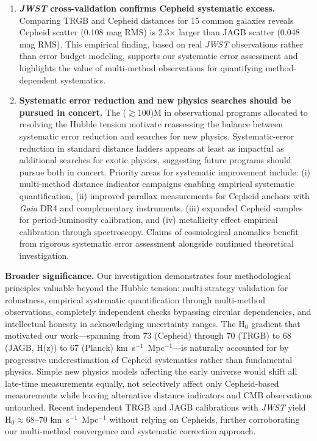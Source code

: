 \documentclass[preprint, linenumbers]{aastex701}
\begin{document}
\begin{enumerate}
\item \textbf{\textit{JWST} cross-validation confirms Cepheid systematic excess.} Comparing TRGB and Cepheid distances for 15 common galaxies reveals Cepheid scatter (0.108 mag RMS) is 2.3$\times$ larger than JAGB scatter (0.048 mag RMS). This empirical finding, based on real \textit{JWST} observations rather than error budget modeling, supports our systematic error assessment and highlights the value of multi-method observations for quantifying method-dependent systematics.

\item \textbf{Systematic error reduction and new physics searches should be pursued in concert.} The ($\gtrsim$100)M in observational programs allocated to resolving the Hubble tension motivate reassessing the balance between systematic error reduction and searches for new physics. Systematic-error reduction in standard distance ladders appears at least as impactful as additional searches for exotic physics, suggesting future programs should pursue both in concert. Priority areas for systematic improvement include: (i) multi-method distance indicator campaigns enabling empirical systematic quantification, (ii) improved parallax measurements for Cepheid anchors with \textit{Gaia} DR4 and complementary instruments, (iii) expanded Cepheid samples for period-luminosity calibration, and (iv) metallicity effect empirical calibration through spectroscopy. Claims of cosmological anomalies benefit from rigorous systematic error assessment alongside continued theoretical investigation.

\end{enumerate}

\textbf{Broader significance.} Our investigation demonstrates four methodological principles valuable beyond the Hubble tension: multi-strategy validation for robustness, empirical systematic quantification through multi-method observations, completely independent checks bypassing circular dependencies, and intellectual honesty in acknowledging uncertainty ranges. The H$_0$ gradient that motivated our work---spanning from 73 (Cepheid) through 70 (TRGB) to 68 (JAGB, H(z)) to 67 (Planck) km~s$^{-1}$~Mpc$^{-1}$---is naturally accounted for by progressive underestimation of Cepheid systematics rather than fundamental physics. Simple new physics models affecting the early universe would shift all late-time measurements equally, not selectively affect only Cepheid-based measurements while leaving alternative distance indicators and CMB observations untouched. Recent independent TRGB and JAGB calibrations with \textit{JWST} \citep{Freedman2025a,Lee2025} yield H$_0 \approx 68$--70 km~s$^{-1}$~Mpc$^{-1}$ without relying on Cepheids, further corroborating our multi-method convergence and systematic correction approach.
\end{document}
